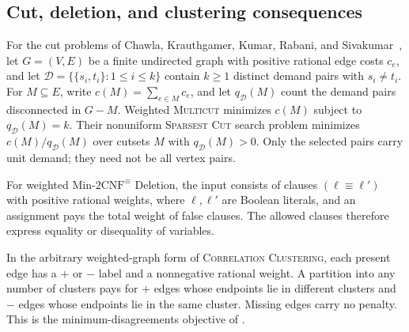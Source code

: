 \subsection{Cut, deletion, and clustering consequences}

For the cut problems of Chawla, Krauthgamer, Kumar, Rabani, and
Sivakumar~\cite[Section~1]{CKKRS2006}, let \(G=(V,E)\) be a finite
undirected graph with positive rational edge costs \(c_e\), and let
\(\mathcal D=\{\{s_i,t_i\}:1\le i\le k\}\) contain \(k\ge1\)
distinct demand pairs with \(s_i\ne t_i\). For \(M\subseteq E\), write
\(c(M)=\sum_{e\in M}c_e\), and let \(q_{\mathcal D}(M)\) count
the demand pairs disconnected in \(G-M\).
Weighted \textsc{Multicut} minimizes \(c(M)\) subject to
\(q_{\mathcal D}(M)=k\). Their nonuniform \textsc{Sparsest Cut}
search problem minimizes \(c(M)/q_{\mathcal D}(M)\) over cutsets
\(M\) with \(q_{\mathcal D}(M)>0\). Only the selected pairs carry
unit demand; they need not be all vertex pairs.

For weighted Min-\(2\mathrm{CNF}^{\equiv}\) Deletion, the input
consists of clauses \((\ell\equiv\ell')\) with positive rational
weights, where \(\ell,\ell'\) are Boolean literals, and an assignment
pays the total weight of false clauses. The allowed clauses therefore
express equality or disequality of variables.

In the arbitrary weighted-graph form of \textsc{Correlation Clustering},
each present edge has a \(+\) or \(-\) label and a nonnegative rational
weight. A partition into any number of clusters pays for \(+\) edges
whose endpoints lie in different clusters and \(-\) edges whose
endpoints lie in the same cluster. Missing edges carry no penalty.
This is the minimum-disagreements objective of
\cite[Section~2.1]{DemaineEtAl2006Clustering}.

